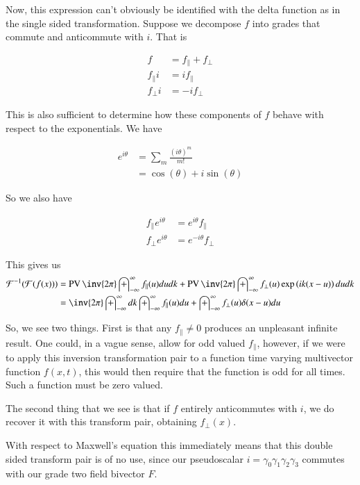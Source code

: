 \documentclass{article}
\DeclareMathOperator{\PV}{PV}
\newcommand{\FF}[0]{\mathcal{F}}
\newcommand{\IIinf}[0]{ \int_{-\infty}^\infty }
\begin{document}
Now, this expression can't obviously be identified with the delta function as in the single sided transformation.  Suppose we decompose $f$ into grades that 
commute and anticommute with $i$.  That is

\begin{align*}
f &= f_\parallel + f_\perp \\
f_\parallel i &= i f_\parallel  \\
f_\perp  i &= -i f_\perp 
\end{align*}

This is also sufficient to determine how these components of $f$ behave with respect to the exponentials.  We have

\begin{align*}
e^{i\theta} 
&= \sum_m \frac{(i\theta)^m}{m!} \\
&= \cos(\theta) + i\sin(\theta)
\end{align*}

So we also have

\begin{align*}
f_\parallel e^{i\theta} &= e^{i\theta} f_\parallel  \\
f_\perp e^{i\theta} &= e^{-i\theta} f_\perp 
\end{align*}

This gives us
\begin{align*}
\FF^{-1}(\FF(f(x)))
&=
\PV \inv{{2\pi}} \IIinf f_\parallel(u) du dk 
+\PV \inv{{2\pi}} \IIinf f_\perp(u) \exp\left( i k (x -u) \right) du dk \\
&=
\inv{{2\pi}} \IIinf dk \IIinf f_\parallel(u) du +\IIinf f_\perp(u) \delta( x -u ) du \\
\end{align*}

So, we see two things.  First is that any $f_\parallel \ne 0$ produces an unpleasant infinite result.  One could, in a vague sense, allow for odd valued $f_\parallel$, however, if we were to apply this inversion transformation pair to a function time varying multivector function $f(x,t)$, this would then require that the function is odd for all times.  Such a function must be zero valued. %

The second thing that we see is that if $f$ entirely anticommutes with $i$, we do recover it with this transform pair, obtaining $f_\perp(x)$.

With respect to Maxwell's equation
this immediately means that this double sided transform pair is of no use, since our pseudoscalar $i = \gamma_0 \gamma_1\gamma_2 \gamma_3$ commutes with our grade two 
field bivector $F$.
\end{document}

